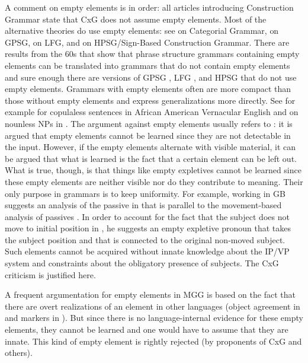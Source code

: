 \documentclass[output=paper
	        ,collection
	        ,collectionchapter
 	        ,biblatex
                ,babelshorthands
                ,newtxmath
                ,draftmode
                ,colorlinks, citecolor=brown
]{langscibook}
\begin{document}
A comment on empty elements is in order: all articles introducing Construction Grammar state that
CxG does not assume empty elements. Most of the alternative theories do use empty elements: see
\citet{KoenigE99a-u} on Categorial Grammar, \citet*[]{GKPS85a} on GPSG, \citet[]{Bresnan2001a} on LFG,  and  on HPSG/Sign-Based
Construction Grammar. There are results from the 60s that show that phrase structure grammars
containing empty elements can be translated into grammars that do not contain empty elements
\citep*[, Lemma~4.1]{BHPS61a} and sure enough there are versions of GPSG \citep[--77]{Uszkoreit87a}, LFG \citep{KZ89a,DKK2001a-u}, and HPSG \parencites{BMS2001a}[]{Sag2010b} that do not use empty elements. Grammars with empty elements often are more compact than
those without empty elements and express generalizations more directly. See for example
\citet{Bender2000a} for copulaless sentences in African American Vernacular
English and \citet{Mueller2004e} on nounless NPs in
. The argument against empty elements usually refers to : it
is argued that empty elements cannot be learned since they are not detectable in the input. However,
if the empty elements alternate with visible material, it can be argued that what is learned is the
fact that a certain element can be left out. What is true, though, is that things like empty
expletives cannot be learned since these empty elements are neither visible nor do they contribute to
meaning. Their only purpose in grammars is to keep uniformity. For example, \citet{Grewendorf93}
working in GB suggests an analysis of the passive in  that is parallel to the movement-based analysis of 
passives \citep[]{Chomsky81a}. In order to account for the fact that the subject does not move to
initial position in , he suggests an empty expletive pronoun that takes the subject position and that is connected to the original
non-moved subject. Such elements cannot be acquired without innate knowledge about the IP/VP system and
constraints about the obligatory presence of subjects. The CxG criticism is justified here.

A frequent argumentation for empty elements in MGG is based on the fact that there are overt
realizations of an element in other languages (\eg object agreement in  and  markers in
). But since there is no language-internal evidence for these empty elements, they cannot be
learned and one would have to assume that they are innate. This kind of empty element is rightly
rejected (by proponents of CxG and others).
\end{document}
